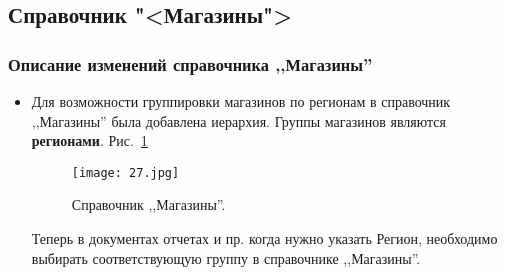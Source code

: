 \subsection{Справочник "<Магазины">}
\subsubsection{Описание изменений справочника ,,Магазины''}
\begin{itemize}	
	\item Для возможности группировки магазинов по регионам в справочник ,,Магазины'' была добавлена иерархия.
	Группы магазинов являются \textbf{регионами\underline{}}. 
	Рис.~\ref{ris:27.jpg}	
	\begin{figure}[H]
		\texttt{[image: 27.jpg]}
		\caption{Справочник ,,Магазины''.}
		\label{ris:27.jpg}
	\end{figure}
	Теперь в документах отчетах и пр. когда нужно указать Регион, необходимо выбирать соответствующую  группу в справочнике ,,Магазины''.

\end{itemize}
